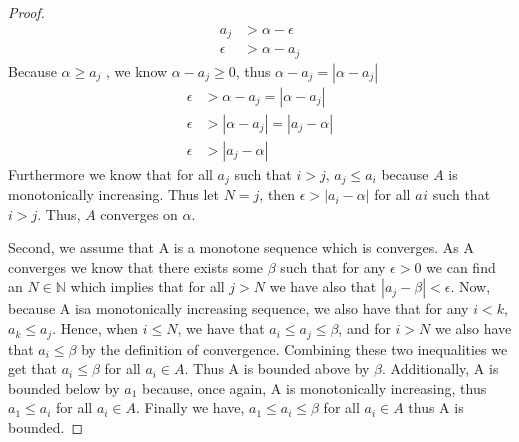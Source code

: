 \documentclass[11pt, leqno]{article}
\begin{document}
\begin{enumerate}
\begin{proof}
	 \begin{align*}
		a_{j} &> \alpha - \epsilon \\
		\epsilon &> \alpha - a_{j}
	\end{align*}
	Because $\alpha \geq a_{j}$ , we know $\alpha - a_{j} \geq 0$, thus $\alpha - a_{j} = | \alpha - a_{j} |$
	\begin{align*}
		\epsilon &> \alpha - a_{j} = | \alpha - a_{j} | \\
		\epsilon &> | \alpha - a_{j} | = | a_{j}  - \alpha | \\
		\epsilon &> | a_{j}  - \alpha |
	\end{align*}
	Furthermore we know that for all $a_{j}$ such that $i > j$, $a_{j} \leq a_{i}$ because $A$ is monotonically increasing. Thus let $N = j$, then $\epsilon > | a_{i}  - \alpha |$ for all $a_{}i$ such that $i > j$. Thus, $A$ converges on $\alpha$.
	 
	 Second, we assume that A is a monotone sequence which is converges. As A converges we know that there exists some $\beta$ such that for any $\epsilon > 0$ we can find an $N \in \mathbb{N}$ which implies that for all $j > N$ we have also that $| a_{j}  - \beta | < \epsilon$. Now, because A isa monotonically increasing sequence, we also have that for any $i < k$, $a_{k} \leq a_{j}$. Hence, when $i \leq N$, we have that $a_{i} \leq a_{j} \leq \beta$, and for $i > N$ we also have that $a_{i} \leq \beta$ by the definition of convergence. Combining these two inequalities we get that $a_{i} \leq \beta$ for all $a_{i} \in A$. Thus A is bounded above by $\beta$. Additionally, A is bounded below by $a_{1}$ because, once again, A is monotonically increasing, thus $a_{1} \leq a_{i}$ for all $a_{i} \in A$. Finally we have, $a_{1} \leq a_{i} \leq \beta$ for all $a_{i} \in A$ thus A is bounded.
	 
	 \end{proof}
	
\end{enumerate}
\end{document}
